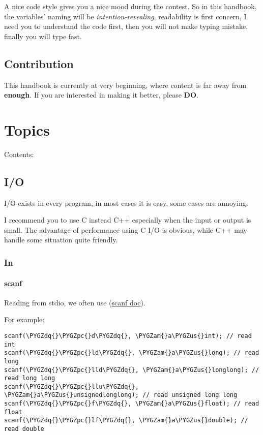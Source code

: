 \documentclass[letterpaper,10pt,english]{sphinxmanual}
\def\PYGZus{\char`\_}
\def\PYGZam{\char`\&}
\def\PYGZpc{\char`\%}
\def\PYGZdq{\char`\"}
\begin{document}
A nice code style gives you a nice mood during the contest. So in this handbook,
the variables' naming will be \emph{intention-revealing}, readability is first concern,
I need you to understand the code first, then you will not make typing mistake,
finally you will type fast.


\section{Contribution}
\label{intro:contribution}
This handbook is currently at very beginning, where content is far away from \textbf{enough}.
If you are interested in making it better, please \textbf{DO}.


\chapter{Topics}
\label{topics:topics}\label{topics::doc}
Contents:


\section{I/O}
\label{topics/io::doc}\label{topics/io:i-o}
I/O exists in every program, in most cases it is easy, some cases are annoying.

I recommend you to use C instead C++ especially when the input or output is small.
The advantage of performance using C I/O is obvious, while C++ may handle some
situation quite friendly.


\subsection{In}
\label{topics/io:in}

\subsubsection{scanf}
\label{topics/io:scanf}
Reading from stdio, we often use  (\href{http://en.cppreference.com/w/cpp/io/c/fscanf}{scanf doc}).

For example:

\begin{Verbatim}[commandchars=\\\{\}]
scanf(\PYGZdq{}\PYGZpc{}d\PYGZdq{}, \PYGZam{}a\PYGZus{}int); // read int
scanf(\PYGZdq{}\PYGZpc{}ld\PYGZdq{}, \PYGZam{}a\PYGZus{}long); // read long
scanf(\PYGZdq{}\PYGZpc{}lld\PYGZdq{}, \PYGZam{}a\PYGZus{}longlong); // read long long
scanf(\PYGZdq{}\PYGZpc{}llu\PYGZdq{}, \PYGZam{}a\PYGZus{}unsignedlonglong); // read unsigned long long
scanf(\PYGZdq{}\PYGZpc{}f\PYGZdq{}, \PYGZam{}a\PYGZus{}float); // read float
scanf(\PYGZdq{}\PYGZpc{}lf\PYGZdq{}, \PYGZam{}a\PYGZus{}double); // read double
\end{Verbatim}
\end{document}
